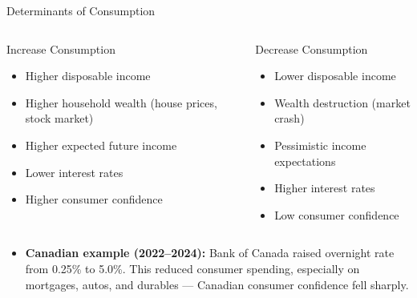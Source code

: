 \documentclass[aspectratio=169]{beamer}
\begin{document}

\begin{frame}{Determinants of Consumption}
\transfade
\begin{columns}
\begin{block}{\textcolor{accent}{Increase Consumption}}
\begin{itemize}
  \item Higher disposable income
  \item Higher household wealth (house prices, stock market)
  \item Higher expected future income
  \item Lower interest rates
  \item Higher consumer confidence
\end{itemize}
\end{block}
\begin{block}{\textcolor{canadared}{Decrease Consumption}}
\begin{itemize}
  \item Lower disposable income
  \item Wealth destruction (market crash)
  \item Pessimistic income expectations
  \item Higher interest rates
  \item Low consumer confidence
\end{itemize}
\end{block}
\end{columns}
\vspace{0.5em}
\begin{itemize}[<+->]
  \item \textbf{Canadian example (2022--2024):} Bank of Canada raised overnight rate from 0.25\% to 5.0\%. This reduced consumer spending, especially on mortgages, autos, and durables --- Canadian consumer confidence fell sharply.
\end{itemize}
\end{frame}
\end{document}
